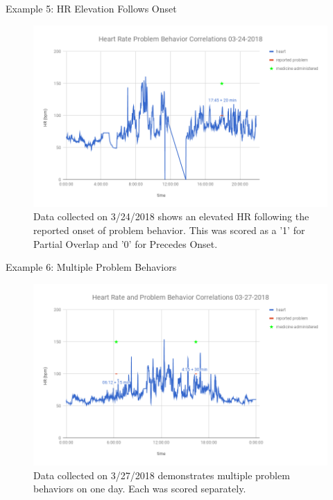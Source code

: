 \documentclass[final]{beamer}
\newlength{\onecolwid}
\newlength{\twocolwid}
\begin{document}
\begin{frame}[t]
\begin{columns}[t]
\begin{column}{\twocolwid}
\begin{columns}[t,totalwidth=\twocolwid]
\begin{column}{\onecolwid}
\begin{block}{Example 5: HR Elevation Follows Onset}
	\begin{figure}
		\includegraphics[width=0.8\linewidth]{Example5.png}
		\caption{Data collected on 3/24/2018 shows an elevated HR following the reported onset of problem behavior. This was scored as a '1' for Partial Overlap and '0' for Precedes Onset.}
	\end{figure}
	
\end{block}


\begin{block}{Example 6: Multiple Problem Behaviors}
	
	\begin{figure}
		\includegraphics[width=0.8\linewidth]{Example6.png}
		\caption{Data collected on 3/27/2018 demonstrates multiple problem behaviors on one day. Each was scored separately.}
	\end{figure}
	
\end{block}


\end{column} %


\end{columns}
\end{column}
\end{columns}
\end{frame}
\end{document}
